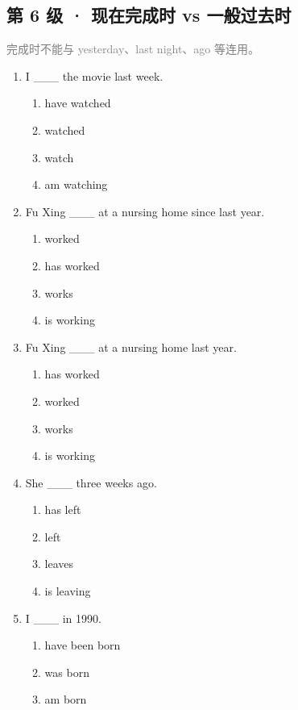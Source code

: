 \documentclass[11pt,a4paper]{ctexart}
\begin{document}
\subsection*{第 6 级 · 现在完成时 vs 一般过去时}
\noindent\textcolor{gray}{完成时不能与 yesterday、last night、ago 等连用。}\par\smallskip
\begin{enumerate}[leftmargin=*,itemsep=4pt]
\item I \_\_\_ the movie last week.
\begin{enumerate}[label=\Alph*.,leftmargin=2em,itemsep=1pt,topsep=2pt]
\item have watched
\item watched
\item watch
\item am watching
\end{enumerate}
\item Fu Xing \_\_\_ at a nursing home since last year.
\begin{enumerate}[label=\Alph*.,leftmargin=2em,itemsep=1pt,topsep=2pt]
\item worked
\item has worked
\item works
\item is working
\end{enumerate}
\item Fu Xing \_\_\_ at a nursing home last year.
\begin{enumerate}[label=\Alph*.,leftmargin=2em,itemsep=1pt,topsep=2pt]
\item has worked
\item worked
\item works
\item is working
\end{enumerate}
\item She \_\_\_ three weeks ago.
\begin{enumerate}[label=\Alph*.,leftmargin=2em,itemsep=1pt,topsep=2pt]
\item has left
\item left
\item leaves
\item is leaving
\end{enumerate}
\item I \_\_\_ in 1990.
\begin{enumerate}[label=\Alph*.,leftmargin=2em,itemsep=1pt,topsep=2pt]
\item have been born
\item was born
\item am born

\end{enumerate}
\end{enumerate}
\end{document}
